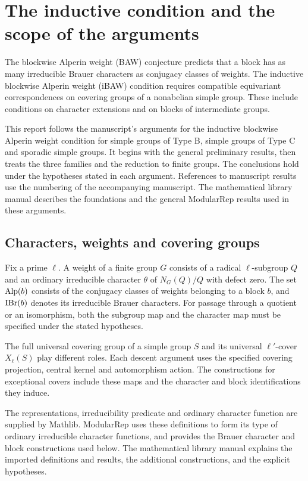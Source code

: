 \chapter{The inductive condition and the scope of the arguments}
\label{chap:current-scope}

The blockwise Alperin weight (BAW) conjecture predicts that a block has as many
irreducible Brauer characters as conjugacy classes of weights. The
inductive blockwise Alperin weight (iBAW) condition requires compatible
equivariant correspondences on
covering groups of a nonabelian simple group. These include conditions
on character extensions and on blocks of intermediate groups.

This report follows the manuscript's arguments for the inductive
blockwise Alperin weight condition for simple groups of Type B, simple
groups of Type C and sporadic simple groups. It begins with the general
preliminary results, then treats the three families and the reduction to
finite groups. The conclusions hold under the hypotheses stated in each
argument. References to manuscript results use the numbering of the accompanying
manuscript.
The mathematical library manual describes the foundations and the general
ModularRep results used in these arguments.

\section{Characters, weights and covering groups}

Fix a prime $\ell$. A weight of a finite group $G$ consists of a radical
$\ell$-subgroup $Q$ and an ordinary irreducible character $\theta$ of
$N_G(Q)/Q$ with defect zero. The set $\operatorname{Alp}(b)$ consists of the conjugacy
classes of weights belonging to a block $b$, and $\operatorname{IBr}(b)$ denotes its
irreducible Brauer characters. For passage through a quotient or an isomorphism, both the subgroup map and the character map must be specified under the stated hypotheses.

The full universal covering group of a simple group $S$ and its universal
$\ell'$-cover $X_\ell(S)$ play different roles. Each descent argument uses
the specified covering projection, central kernel and automorphism
action. The constructions for exceptional covers include these maps
and the character and block identifications they induce.

\begin{implementation}
The representations, irreducibility predicate and ordinary character
function are supplied by Mathlib. ModularRep uses these definitions to
form its type of ordinary irreducible character functions, and provides
the Brauer character and block constructions used below. The mathematical
library manual explains the imported definitions and results, the
additional constructions, and the explicit hypotheses.
\end{implementation}

